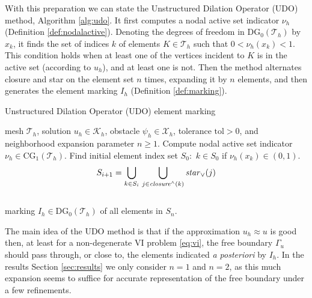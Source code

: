 \documentclass[]{interact}
\theoremstyle{plain}%
\theoremstyle{definition}
\theoremstyle{remark}
\newcommand{\cK}{\mathcal{K}}
\newcommand{\cT}{\mathcal{T}}
\newcommand{\cX}{\mathcal{X}}
\newcommand{\CG}{\text{CG}}
\newcommand{\DG}{\text{DG}}
\begin{document}
With this preparation we can state the Unstructured Dilation Operator (UDO) method, Algorithm \ref{alg:udo}.  It first computes a nodal active set indicator $\nu_h$ (Definition \ref{def:nodalactive}).  Denoting the degrees of freedom in $\DG_0(\cT_h)$ by $x_k$, it finds the set of indices $k$ of elements $K\in\cT_h$ such that $0<\nu_h(x_k)<1$.  This condition holds when at least one of the vertices incident to $K$ is in the active set (according to $u_h$), and at least one is not.  Then the method alternates closure and star on the element set $n$ times, expanding it by $n$ elements, and then generates the element marking $I_h$ (Definition \ref{def:marking}).

\begin{algorithm}[ht]
	\caption{Unstructured Dilation Operator (UDO) element marking}
	\begin{algorithmic}[1]
		\Require mesh $\cT_h$, solution $u_h \in \cK_h$, obstacle $\psi_h \in \cX_h$, tolerance $\text{tol} > 0$, and neighborhood expansion parameter $n\ge 1$.
		\State Compute nodal active set indicator $\nu_h \in \CG_1(\cT_h)$.
		\State Find initial element index set $S_0$: \,$k\in S_0$ if $\nu_h(x_k) \in (0,1)$.
		    $$S_{i+1} = \bigcup_{k\in S_i}\, \bigcup_{j\in \text{\emph{closure}}^\wedge(k)} \text{\emph{star}}_\vee(j)$$
		\EndFor \\
		\Return marking $I_h \in \DG_0(\cT_h)$ of all elements in $S_n$.
	\end{algorithmic}
\label{alg:udo}
\end{algorithm}

The main idea of the UDO method is that if the approximation $u_h\approx u$ is good then, at least for a non-degenerate VI problem \eqref{eq:vi}, the free boundary $\Gamma_u$ should pass through, or close to, the elements indicated \emph{a posteriori} by $I_h$.  In the results Section \ref{sec:results} we only consider $n=1$ and $n=2$, as this much expansion seems to suffice for accurate representation of the free boundary under a few refinements.
\end{document}
